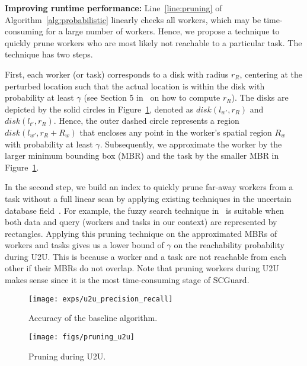 \documentclass{USC-Thesis}
\newcommand{\SCG}{{SCGuard}}
\numberwithin{equation}{chapter}
\begin{document}
\textbf{Improving runtime performance:}
Line~\ref{line:pruning} of Algorithm~\ref{alg:probabilistic} linearly checks all workers, which may be time-consuming for a large number of workers. Hence, we propose a technique to quickly prune workers who are most likely not reachable to a particular task. The technique has two steps.

First, each worker (or task) corresponds to a disk with radius $r_R$, centering at the perturbed location such that the actual location is within the disk with probability at least $\gamma$ (see Section 5 in~\cite{andres2013geo} on how to compute $r_R$). The disks are depicted by the solid circles in Figure~\ref{fig:pruning_u2u}, denoted as $disk(l_{w'},r_R)$ and $disk(l_{t'},r_R)$. Hence, the outer dashed circle represents a region $disk(l_{w'},r_R+R_w)$ that encloses any point in the worker's spatial region $R_w$ with probability at least $\gamma$. Subsequently, we approximate the worker by the larger minimum bounding box (MBR) and the task by the smaller MBR in Figure~\ref{fig:pruning_u2u}.

In the second step, we build an index to quickly prune far-away workers from a task without a full linear scan by applying existing techniques in the uncertain database field~\cite{tao2007range,bernecker2011novel}. For example, the fuzzy search technique in~\cite{tao2007range} is suitable when both data and query (workers and tasks in our context) are represented by rectangles. Applying this pruning technique on the approximated MBRs of workers and tasks gives us a lower bound of $\gamma$ on the reachability probability during U2U. This is because a worker and a task are not reachable from each other if their MBRs do not overlap.
Note that pruning workers during U2U makes sense since it is the most time-consuming stage of \SCG. %

\begin{figure}[!ht]
	\begin{minipage}[b]{0.45\linewidth}
		\centering
		\texttt{[image: exps/u2u\_precision\_recall]}
        \captionsetup{format=hang}
		\caption{Accuracy of the baseline algorithm.}
		\label{fig:u2u_precision_recall}
	\end{minipage}
	\vspace{5pt}
	\begin{minipage}[b]{0.55\linewidth}
		\centering
		\texttt{[image: figs/pruning\_u2u]}
        \captionsetup{format=hang}
		\caption{Pruning during U2U.}
		\label{fig:pruning_u2u}
	\end{minipage}
\end{figure}
\end{document}
